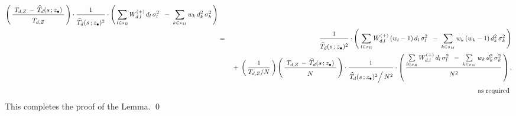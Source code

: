 \begin{enumerate}
\begin{eqnarray*}
        \left(\,
            \dfrac{
                {\color{white}.}
                T_{d,Z} \,-\, \widehat{T}_{d}(s\,;\zdot)
                {\color{white}.}
                }{
                \overset{{\color{white}.}}{
                    T_{d,Z}
                    }
                }           
            \,\right)
        \cdot
        \dfrac{
            1
            }{
            \overset{{\color{white}.}}{
                \widehat{T}_{d}(s\,;\zdot)^{2}
                }
            }
        \cdot
        \left(\,
            \underset{l \in s_{R}}{\sum}\,
            W^{(+)}_{d,l}\,d_{l}\,\sigma_{l}^{2}
            \;\;-\;
            \underset{k \in s_{M}}{\sum}\,
            w_{k}\,d_{k}^{2}\,\sigma_{k}^{2}
            \,\right)
    \\
    & = &
        \dfrac{
            1
            }{
            \overset{{\color{white}.}}{
                \widehat{T}_{d}(s\,;\zdot)^{2}
                }
            }
        \cdot
        \left(\;
            \underset{l \in s_{R}}{\sum}\,
            W^{(+)}_{d,l}\,(w_{l}-1)\,d_{l}\,\sigma_{l}^{2}
            \;\;-\;
            \underset{k \in s_{M}}{\sum}\,
            w_{k}\,(w_{k}-1)\,d_{k}^{2}\,\sigma_{k}^{2}
            \,\right)
    \\
    &&
        \; + \;
        \left(\,
            \dfrac{1}{T_{d,Z} \slash N}
            \,\right)
        \left(\,
            \dfrac{
                {\color{white}.}
                T_{d,Z} \,-\, \widehat{T}_{d}(s\,;\zdot)
                {\color{white}.}
                }{
                \overset{{\color{white}.}}{
                    N
                    }
                }           
            \,\right)
        \cdot
        \dfrac{
            1
            }{
            \overset{{\color{white}.}}{
                \left. \widehat{T}_{d}(s\,;\zdot)^{2} \right\slash N^{2}
                }
            }
        \cdot
        \left(\,
            \dfrac{
                \underset{l \in s_{R}}{\sum}\,
                W^{(+)}_{d,l}\,d_{l}\,\sigma_{l}^{2}
                \;\;-\;
                \underset{k \in s_{M}}{\sum}\,
                w_{k}\,d_{k}^{2}\,\sigma_{k}^{2}
                }{
                \overset{{\color{white}.}}{N^{2}}                
                }
            \,\right),
    \\
    &&
        \quad
        \overset{{\color{white}.}}{\textnormal{
            as required
            }}
    \end{eqnarray*}
    \vskip 0.1cm
    \noindent
    This completes the proof of the Lemma.
    \qed
\end{enumerate}

